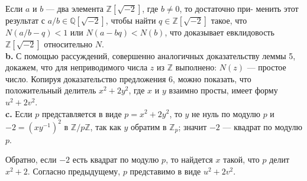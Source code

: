 Если $a$ и $b$ --- два элемента $\mathbb{Z}[\sqrt{-2}]$, где $b\neq0$, то достаточно при-\linebreak
менить этот результат с $a/b\in\mathbb{Q}[\sqrt{-2}]$, чтобы найти $q\in\mathbb{Z}[\sqrt{-2}]$ такое,\linebreak
что $N(a/b-q)<1$ или $N(a-bq)<N(b)$, что доказывает евклидовость
$\mathbb{Z}[\sqrt{-2}]$ относительно $N$.\newline
\\ 
\hspace*{15pt}\textbf{b.} С помощью рассуждений, совершенно аналогичных доказатель­ству\linebreak
леммы 5, докажем, что для неприводимого числа $z$ из $\mathbb{Z}$ выполнено:\linebreak
$N(z)$ --- простое число. Копируя доказательство предложения 6, мож­но\linebreak
показать, что положительный делитель $x^2+2y^2$, где $x$ и $y$ взаимно\linebreak
просты, имеет форму $u^2+2v^2$.\newline
\\
\hspace*{15pt}\textbf{c.} Если $p$ представляется в виде $p=x^2+2y^2$, то $y$ не нуль по модулю\linebreak
$p$ и $-2=(xy^{-1})^2$ в $\mathbb{Z}/p\mathbb{Z}$, так как $y$ обратим в $\mathbb{Z}_p$; значит $-2$ --- квадрат\linebreak
по модулю $p$.

Обратно, если $-2$ есть квадрат по модулю $p$, то найдется $x$\linebreak 
та­кой, что $p$ делит $x^2+2$. Согласно предыдущему, $p$ представимо в виде\linebreak
$u^2+2v^2$.\newline
\\

